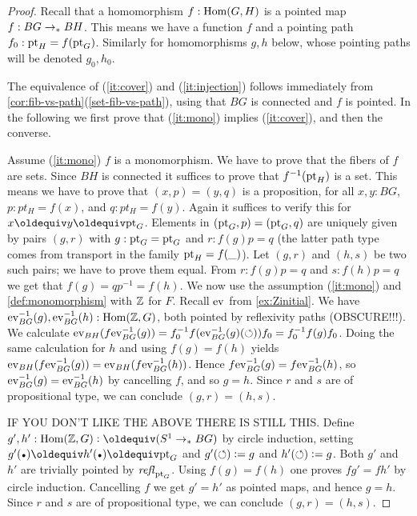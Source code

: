 \begin{proof}
  
Recall that a homomorphism $f: \mathrm{Hom}(G,H)$ is a pointed map $f: BG\to_\ast BH$.
This means we have a function $f$ and a pointing path $f_0 : \mathrm{pt}_H = f(\mathrm{pt}_G)$. 
Similarly for homomorphisms $g,h$ below, whose pointing paths will be denoted $g_0,h_0$.

The equivalence of (\ref{it:cover}) and (\ref{it:injection}) follows
immediately from \cref{cor:fib-vs-path}(\ref{set-fib-vs-path}), using
that $BG$ is connected and $f$ is pointed.
In the following we first prove that (\ref{it:mono}) implies (\ref{it:cover}),
and then the converse.

Assume (\ref{it:mono}) $f$ is a monomorphism. 
We have to prove that the fibers of $f$ are sets.
Since $BH$ is connected it suffices to prove that $f^{-1}(\mathrm{pt}_H)$ is a set. 
This means we have to prove that $(x,p) = (y,q)$ is a proposition,
for all $x,y:BG$, $p: pt_H = f(x)$, and $q: pt_H = f(y)$.
Again it suffices to verify this for $x\jdeq y\jdeq\pt_G$.
Elements in $(\mathrm{pt}_G,p) = (\mathrm{pt}_G,q)$ are uniquely given by pairs $(g,r)$
with $g: \mathrm{pt}_G = \mathrm{pt}_G$ and $r : f(g)p = q$
(the latter path type comes from transport in the family $\mathrm{pt}_H = f(\_)$).
Let $(g,r)$ and $(h,s)$ be two such pairs; we have to prove them equal. 
From $r : f(g)p = q$ and $s : f(h)p = q$ we get that $f(g)=qp^{-1}=f(h)$.
We now use the assumption (\ref{it:mono}) and
\cref{def:monomorphism} with $\mathbb{Z}$ for $F$.
Recall $\mathrm{ev}$ from \cref{ex:Zinitial}. 
We have $\mathrm{ev}_{BG}^{-1}(g),\mathrm{ev}_{BG}^{-1}(h) : \mathrm{Hom}(\mathbb{Z},G)$,
both pointed by reflexivity paths (OBSCURE!!!). We calculate
$\mathrm{ev}_{BH}(f\mathrm{ev}_{BG}^{-1}(g)) = f_0^{-1} f(\mathrm{ev}_{BG}^{-1}(g)(\circlearrowleft)) f_0 = f_0^{-1} f(g) f_0$.
Doing the same calculation for $h$ and using $f(g)=f(h)$ yields
$\mathrm{ev}_{BH}(f\mathrm{ev}_{BG}^{-1}(g)) = \mathrm{ev}_{BH}(f\mathrm{ev}_{BG}^{-1}(h))$.
Hence $f\mathrm{ev}_{BG}^{-1}(g) = f\mathrm{ev}_{BG}^{-1}(h)$, so
$\mathrm{ev}_{BG}^{-1}(g) = \mathrm{ev}_{BG}^{-1}(h)$ by cancelling $f$, and so $g=h$. 
Since $r$ and $s$ are of propositional type, we can conclude $(g,r) = (h,s)$.

IF YOU DON'T LIKE THE ABOVE THERE IS STILL THIS.
Define $g',h': \Hom(\ZZ,G) \defeq (\Sc\ptdto BG)$
by circle induction, setting $g'(\base)\jdeq h'(\base)\jdeq\pt_G$
and $g'(\circlearrowleft)\vcentcolon= g$ and $h'(\circlearrowleft)\vcentcolon= g$. Both $g'$ and $h'$
are trivially pointed by $\mathop{\mathit{refl}_{\mathrm{pt}_G}}$. Using $f(g)=f(h)$ one
proves $fg'=fh'$ by circle induction. Cancelling $f$ we get $g'=h'$
as pointed maps, and hence $g=h$. 
Since $r$ and $s$ are of propositional type, we can conclude $(g,r) = (h,s)$.


\end{proof}
